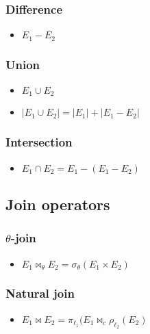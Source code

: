 \documentclass[10pt]{article}
\begin{document}
\subsubsection{Difference}

\begin{itemize}
	\item $E_1 - E_2$
\end{itemize}

\subsubsection{Union}

\begin{itemize}
	\item $E_1 \cup E_2$
	\item $|E_1 \cup E_2| = |E_1| + |E_1 - E_2|$
\end{itemize}

\subsubsection{Intersection}

\begin{itemize}
	\item $E_1 \cap E_2 = E_1 - (E_1 - E_2)$
\end{itemize}

\subsection{Join operators}

\subsubsection{$\theta$-join}

\begin{itemize}
	\item $E_1 \bowtie_{\theta} E_2 = \sigma_{\theta}{(E_1 \times E_2)}$
\end{itemize}

\subsubsection{Natural join}

\begin{itemize}
	\item $E_1 \bowtie E_2 = \pi_{\ell_1}{(E_1 \bowtie_{c} \rho_{\ell_2} (E_2)}$
\end{itemize}
\end{document}
